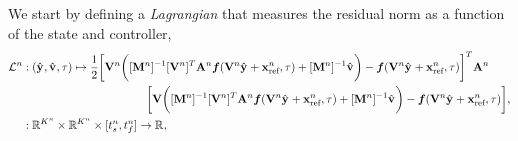 We start by defining a \textit{Lagrangian} that measures the residual norm as a function of the state and controller, 
\begin{equation}\label{eq:obj_controller}
\begin{split}
 \objectiveControlArg{n} &:  (\genstateyDiscreteArgnt{},\controllerDiscreteDumArgnt{},\timeDummy)
\mapsto \frac{1}{2} \bigg[ \basisspaceArg{n} \bigg(  [\massArg{n}]^{-1}\basisspaceTArg{n}
\stweightingMatArgt{n}{t}  \velocity(\basisspaceArg{n} \genstateyDiscreteArgnt{} +
\stateInterceptArg{n},\timeDummy) + [\massArg{n}]^{-1}\controllerDiscreteDumArgnt{} \bigg) -
\velocity(\basisspaceArg{n} \genstateyDiscreteArgnt{} + \stateInterceptArg{n},\timeDummy) \bigg]^T
\stweightingMatArgt{n}{t}  \\ & \hspace{1.5 in}\bigg[ \basisspace \bigg(
[\massArg{n}]^{-1}\basisspaceTArg{n} \stweightingMatArgt{n}{t}\velocity(\basisspaceArg{n}
\genstateyDiscreteArgnt{} + \stateInterceptArg{n},\timeDummy) + [\massArg{n}]^{-1}\controllerDiscreteDumArgnt{}
\bigg) - \velocity( \basisspaceArg{n}  \genstateyDiscreteArgnt{} + \stateInterceptArg{n},\timeDummy ) \bigg]
, \nonumber \\ & : \RR{\romdimArg{n}} \times \RR{\romdimArg{n}} \times [\timeStartArg{n},\timeEndArg{n}] \rightarrow \RR{},
\end{split}
\end{equation}
